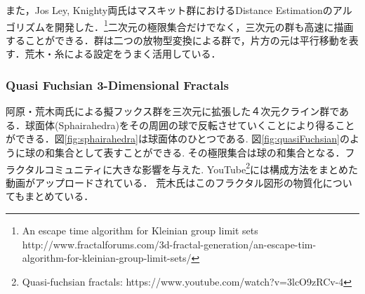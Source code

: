 また，Jos Ley, Knighty両氏はマスキット群におけるDistance Estimationのアルゴリズムを開発した．\footnote{An escape time algorithm for Kleinian group limit sets http://www.fractalforums.com/3d-fractal-generation/an-escape-tim-algorithm-for-kleinian-group-limit-sets/}二次元の極限集合だけでなく，三次元の群も高速に描画することができる．群は二つの放物型変換による群で，片方の元は平行移動を表す．荒木・糸\cite{maskit}による設定をうまく活用している．

\subsubsection{Quasi Fuchsian 3-Dimensional Fractals}
阿原・荒木両氏による擬フックス群を三次元に拡張した４次元クライン群である\cite{sphairahedra}\cite{sphairahedraJa}．球面体(Sphairahedra)をその周囲の球で反転させていくことにより得ることができる．図\ref{fig:sphairahedra}は球面体のひとつである.
図\ref{fig:quasiFuchsian}のように球の和集合として表すことができる.
その極限集合は球の和集合となる．フラクタルコミュニティに大きな影響を与えた. YouTube\footnote{Quasi-fuchsian fractals: https://www.youtube.com/watch?v=3lcO9zRCv-4}には構成方法をまとめた動画がアップロードされている．
荒木氏はこのフラクタル図形の物質化についてもまとめている\cite{materializing}．

